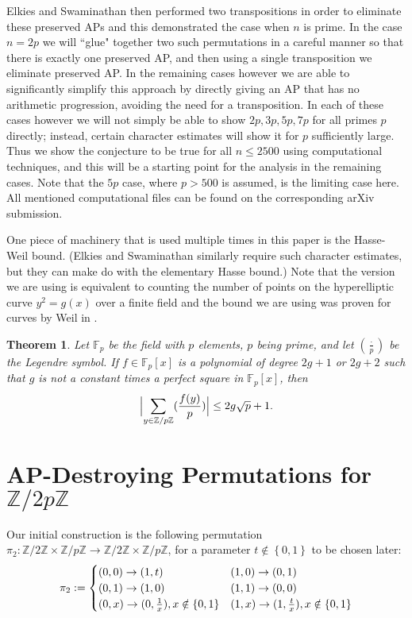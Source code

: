 \documentclass[12pt]{amsart}
\newtheorem{thm}{Theorem}
\theoremstyle{definition}
\theoremstyle{remark}
\newcommand{\Z}{\mathbb Z}
\begin{document}
Elkies and Swaminathan \cite{Ashvin} then performed two transpositions in order to eliminate these preserved APs and this demonstrated the case when $n$ is prime. In the case $n=2p$ we will ``glue" together two such permutations in a careful manner so that there is exactly one preserved AP, and then using a single transposition we eliminate preserved AP. In the remaining cases however we are able to significantly simplify this approach by directly giving an AP that has no arithmetic progression, avoiding the need for a transposition. In each of these cases however we will not simply be able to show $2p, 3p, 5p, 7p$ for all primes $p$ directly; instead, certain character estimates will show it for $p$ sufficiently large. Thus we show the conjecture to be true for all $n\le2500$ using computational techniques, and this will be a starting point for the analysis in the remaining cases. Note that the $5p$ case, where $p>500$ is assumed, is the limiting case here. All mentioned computational files can be found on the corresponding arXiv submission.

One piece of machinery that is used multiple times in this paper is the Hasse-Weil bound. (Elkies and Swaminathan \cite{Ashvin} similarly require such character estimates, but they can make do with the elementary Hasse bound.) Note that the version we are using is equivalent to counting the number of points on the hyperelliptic curve $y^2=g(x)
$ over a finite field and the bound we are using was proven for curves by Weil in \cite{weil1949numbers}.
\begin{thm}\label{hasse-weil}
Let $\mathbb{F}_p$ be the field with $p$ elements, $p$ being prime,
and let $(\frac{\cdot}{p})$ be the Legendre symbol.
If $f \in \mathbb{F}_p[x]$ is a polynomial of degree $2g+1$ or
$2g+2$ such that $g$ is not a constant times a perfect square in $\mathbb{F}_p[x]$, then
\[
\Bigl|\sum_{y \in \Z/p\Z} (\frac{f(y)}{p})\Bigr| \leq 2g\sqrt{p}+1.
\]
\end{thm}

\section{AP-Destroying Permutations for $\Z/2p\Z$}
Our initial construction is the following permutation $\pi_2: \Z/2\Z\times \Z/p\Z\to \Z/2\Z\times \Z/p\Z$, for a parameter $t\notin\left\{0, 1\right\}$ to be chosen later:
\[\pi_2 :=  \setlength{\arraycolsep}{0pt}
  \renewcommand{\arraystretch}{1.2}
  \left\{\begin{array}{l @{\quad} l}
       (0, 0)\to (1, t) & (1, 0)\to (0, 1)
       \\(0, 1)\to (1, 0) & (1, 1)\to (0,0)
       \\(0, x)\to (0, \frac{1}{x}), x\notin\left\{0, 1\right\} & (1, x)\to (1, \frac{t}{x}), x\notin\left\{0, 1\right\}
  \end{array}\right.\]
\end{document}

